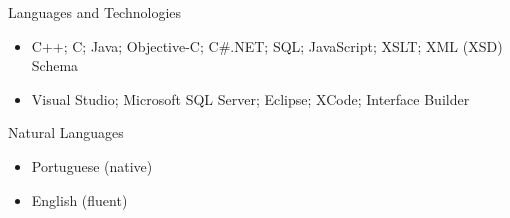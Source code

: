 \documentclass[calibri]{mcdowellcv}
\begin{document}

	\begin{cvsection}{Languages and Technologies}
		\begin{cvsubsection}{}{}{}
			\begin{itemize}
				\item C++; C; Java; Objective-C; C\#.NET; SQL; JavaScript; XSLT; XML (XSD) Schema
				\item Visual Studio; Microsoft SQL Server; Eclipse; XCode; Interface Builder
			\end{itemize}
		\end{cvsubsection}
	\end{cvsection}

	\begin{cvsection}{Natural Languages}
		\begin{cvsubsection}{}{}{}
			\begin{itemize}
					\item Portuguese (native)
					\item English (fluent)
			\end{itemize}
		\end{cvsubsection}
	\end{cvsection}
\end{document}

